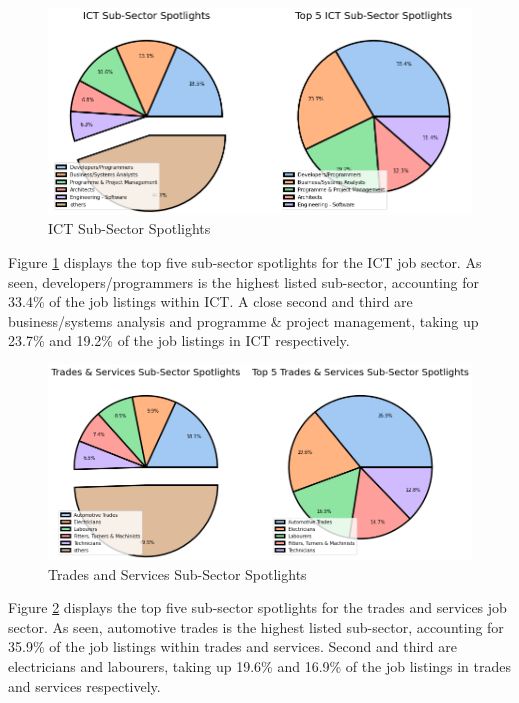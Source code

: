 \documentclass[twoside, 12pt, a4paper]{article}
\begin{document}
\begin{figure}[h]
	\centering
	\includegraphics[scale = 0.50]{ICTspotlights.png}
	\caption{ICT Sub-Sector Spotlights}
	\label{fig:ICTspotlight}
\end{figure}

Figure \ref{fig:ICTspotlight} displays the top five sub-sector spotlights for the ICT job sector. As seen, developers/programmers is the highest listed sub-sector, accounting for 33.4\% of the job listings within ICT. A close second and third are business/systems analysis and programme \& project management, taking up 23.7\% and 19.2\% of the job listings in ICT respectively. 

\begin{figure}[h]
	\centering
	\includegraphics[scale = 0.50]{Tradespotlights.png}
	\caption{Trades and Services Sub-Sector Spotlights}
	\label{fig:Tradespotlight}
\end{figure}

Figure \ref{fig:Tradespotlight} displays the top five sub-sector spotlights for the trades and services job sector. As seen, automotive trades is the highest listed sub-sector, accounting for 35.9\% of the job listings within trades and services. Second and third are electricians and labourers, taking up 19.6\% and 16.9\% of the job listings in trades and services respectively. 
\end{document}
